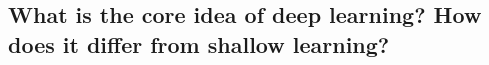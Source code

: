 \documentclass[../main.tex]{subfiles}
\begin{document}
\subsection{What is the core idea of deep learning? How does it differ from shallow learning?}
\end{document}
